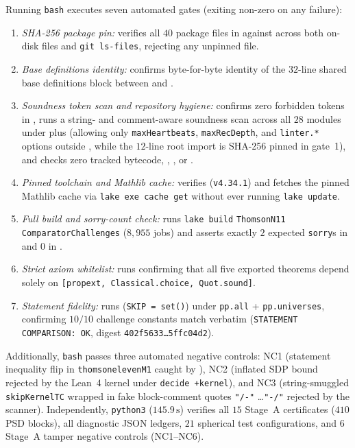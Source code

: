 \documentclass[11pt,reqno]{amsart}
\renewcommand{\_}{\origunderscore\allowbreak}
\theoremstyle{definition}
\begin{document}
Running \texttt{bash}  executes seven automated gates (exiting non-zero on any failure):
\begin{enumerate}[leftmargin=2.2em,itemsep=1pt,topsep=3pt]
  \item \emph{SHA-256 package pin:} verifies all $40$ package files in  against  across both on-disk files and \texttt{git ls-files}, rejecting any unpinned file.
  \item \emph{Base definitions identity:} confirms byte-for-byte identity of the $32$-line shared base definitions block between  and .
  \item \emph{Soundness token scan and repository hygiene:} confirms zero forbidden tokens in , runs a string- and comment-aware soundness scan across all $28$ modules under  plus  (allowing only \texttt{maxHeartbeats}, \texttt{maxRecDepth}, and \texttt{linter.*} options outside , while the $12$-line root import  is SHA-256 pinned in gate~1), and checks zero tracked bytecode, , , or .
  \item \emph{Pinned toolchain and Mathlib cache:} verifies  (\texttt{v4.34.1}) and fetches the pinned Mathlib cache via \texttt{lake exe cache get} without ever running \texttt{lake update}.
  \item \emph{Full build and sorry-count check:} runs \texttt{lake build} \texttt{ThomsonN11} \texttt{ComparatorChallenges} ($8{,}955$ jobs) and asserts exactly $2$ expected \texttt{sorry}s in  and $0$ in .
  \item \emph{Strict axiom whitelist:} runs  confirming that all five exported theorems depend solely on \texttt{[propext, Classical.choice, Quot.sound]}.
  \item \emph{Statement fidelity:} runs  (\texttt{SKIP = set()}) under \texttt{pp.all} + \texttt{pp.universes}, confirming $10/10$ challenge constants match verbatim (\texttt{STATEMENT COMPARISON: OK}, digest \texttt{402f5633\ldots 5ffc04d2}).
\end{enumerate}
Additionally, \texttt{bash}  passes three automated negative controls: NC1 (statement inequality flip in \texttt{thomson\_eleven\_M1} caught by ), NC2 (inflated SDP bound rejected by the Lean~4 kernel under \texttt{decide +kernel}), and NC3 (string-smuggled \texttt{skipKernelTC} wrapped in fake block-comment quotes \texttt{"/-"} \ldots \texttt{"-/"} rejected by the  scanner).
Independently, \texttt{python3}  ($145.9\,\mathrm{s}$) verifies all $15$ Stage~A certificates ($410$ PSD blocks), all diagnostic JSON ledgers, $21$ spherical test configurations, and $6$ Stage~A tamper negative controls (NC1--NC6).
\end{document}
